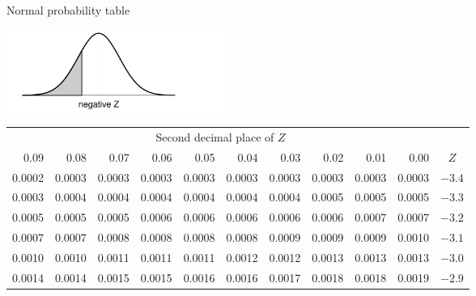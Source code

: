 

\begin{table}[p]
\begin{center}
{\Large Normal probability table} \vspace{5mm}\\
{\small
\includegraphics[width=71mm]{figures/normalTails/normalTailLeft} \vspace{2mm} \\
\begin{tabular}{| rrrrr | rrrrr | c}
  \cline{1-10}
&&& \multicolumn{4}{c}{Second decimal place of $Z$} &&& \\
  \cline{1-10}
0.09 &  0.08 &  0.07 &  0.06 &  0.05 &  0.04 &  0.03 &  0.02 &  0.01 &  0.00 & $Z$  \\
  \hline
  \hline
\scriptsize{0.0002} & \scriptsize{0.0003} & \scriptsize{0.0003} & \scriptsize{0.0003} & \scriptsize{0.0003} & \scriptsize{0.0003} & \scriptsize{0.0003} & \scriptsize{0.0003} & \scriptsize{0.0003} & \scriptsize{0.0003} & $-3.4$ \\
  \scriptsize{0.0003} & \scriptsize{0.0004} & \scriptsize{0.0004} & \scriptsize{0.0004} & \scriptsize{0.0004} & \scriptsize{0.0004} & \scriptsize{0.0004} & \scriptsize{0.0005} & \scriptsize{0.0005} & \scriptsize{0.0005} & $-3.3$ \\
  \scriptsize{0.0005} & \scriptsize{0.0005} & \scriptsize{0.0005} & \scriptsize{0.0006} & \scriptsize{0.0006} & \scriptsize{0.0006} & \scriptsize{0.0006} & \scriptsize{0.0006} & \scriptsize{0.0007} & \scriptsize{0.0007} & $-3.2$ \\
  \scriptsize{0.0007} & \scriptsize{0.0007} & \scriptsize{0.0008} & \scriptsize{0.0008} & \scriptsize{0.0008} & \scriptsize{0.0008} & \scriptsize{0.0009} & \scriptsize{0.0009} & \scriptsize{0.0009} & \scriptsize{0.0010} & $-3.1$ \\
  \scriptsize{0.0010} & \scriptsize{0.0010} & \scriptsize{0.0011} & \scriptsize{0.0011} & \scriptsize{0.0011} & \scriptsize{0.0012} & \scriptsize{0.0012} & \scriptsize{0.0013} & \scriptsize{0.0013} & \scriptsize{0.0013} & $-3.0$ \\
    \hline
    \hline
  \scriptsize{0.0014} & \scriptsize{0.0014} & \scriptsize{0.0015} & \scriptsize{0.0015} & \scriptsize{0.0016} & \scriptsize{0.0016} & \scriptsize{0.0017} & \scriptsize{0.0018} & \scriptsize{0.0018} & \scriptsize{0.0019} & $-2.9$ \\

\end{tabular}}
\end{center}
\end{table}
